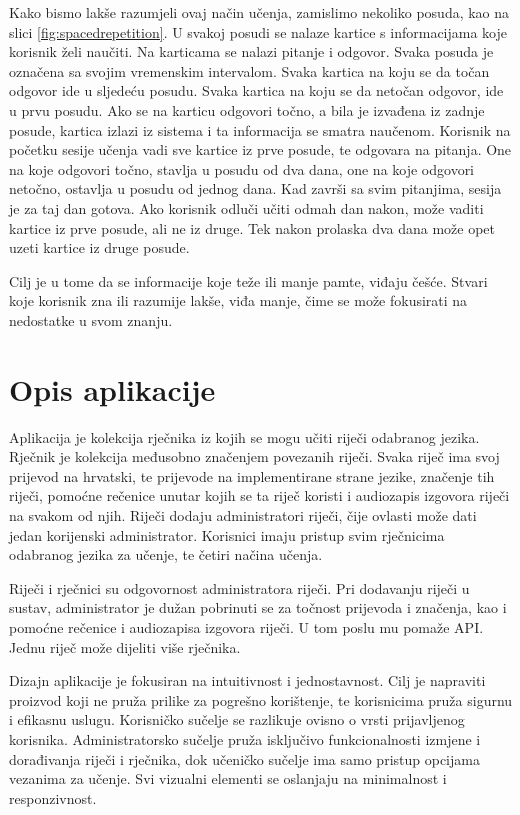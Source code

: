 Kako bismo lakše razumjeli ovaj način učenja, zamislimo nekoliko posuda, kao na slici \ref{fig:spacedrepetition}. 
U svakoj posudi se nalaze kartice s informacijama koje korisnik želi naučiti. Na karticama se nalazi pitanje i odgovor. 
Svaka posuda je označena sa svojim vremenskim intervalom. Svaka kartica na koju se da točan odgovor ide u sljedeću posudu.
 Svaka kartica na koju se da netočan odgovor, ide u prvu posudu. Ako se na karticu odgovori točno, a bila je izvađena iz zadnje 
 posude, kartica izlazi iz sistema i ta informacija se smatra naučenom. Korisnik na početku sesije učenja vadi sve kartice iz prve 
 posude, te odgovara na pitanja. One na koje odgovori točno, stavlja u posudu od dva dana, one na koje odgovori netočno, ostavlja u 
 posudu od jednog dana. Kad završi sa svim pitanjima, sesija je za taj dan gotova. Ako korisnik odluči učiti odmah dan nakon, može vaditi 
 kartice iz prve posude, ali ne iz druge. Tek nakon prolaska dva dana može opet uzeti kartice iz druge posude.

Cilj je u tome da se informacije koje teže ili manje pamte, viđaju češće. Stvari koje korisnik zna ili razumije lakše, viđa manje, čime se može fokusirati na nedostatke u svom znanju.

\eject
\section{Opis aplikacije}

Aplikacija je kolekcija rječnika iz kojih se mogu učiti riječi odabranog jezika. Rječnik je kolekcija međusobno značenjem povezanih riječi. 
Svaka riječ ima svoj prijevod na hrvatski, te prijevode na implementirane strane jezike, značenje tih riječi, pomoćne rečenice unutar kojih se 
ta riječ koristi i audiozapis izgovora riječi na svakom od njih. Riječi dodaju administratori riječi, čije ovlasti može dati jedan korijenski administrator. 
Korisnici imaju pristup svim rječnicima odabranog jezika za učenje, te četiri načina učenja.

Riječi i rječnici su odgovornost administratora riječi. Pri dodavanju riječi u sustav, administrator je dužan pobrinuti se za točnost 
prijevoda i značenja, kao i pomoćne rečenice i audiozapisa izgovora riječi. U tom poslu mu pomaže API. Jednu riječ može dijeliti više rječnika. 

Dizajn aplikacije je fokusiran na intuitivnost i jednostavnost. Cilj je napraviti proizvod koji ne pruža prilike
za pogrešno korištenje, te korisnicima pruža sigurnu i efikasnu uslugu. Korisničko sučelje se razlikuje
ovisno o vrsti prijavljenog korisnika. Administratorsko sučelje pruža isključivo funkcionalnosti izmjene i dorađivanja
riječi i rječnika, dok učeničko sučelje ima samo pristup opcijama vezanima za učenje. Svi vizualni elementi se
oslanjaju na minimalnost i responzivnost.

